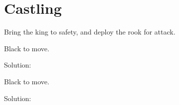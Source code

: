 \documentclass{book}
\begin{document}
\section{Castling}
Bring the king to safety, and deploy the rook for attack.\begin{multicols}{2} 
\begin{samepage} 
\newgame 


 
\showboard
 
 Black to move. 
 
Solution: 
 
\end{samepage}\begin{samepage} 
\newgame 


 
\showboard
 
 Black to move. 
 
Solution: 
 
\end{samepage}\end{multicols} 
\newpage 
\end{document}
